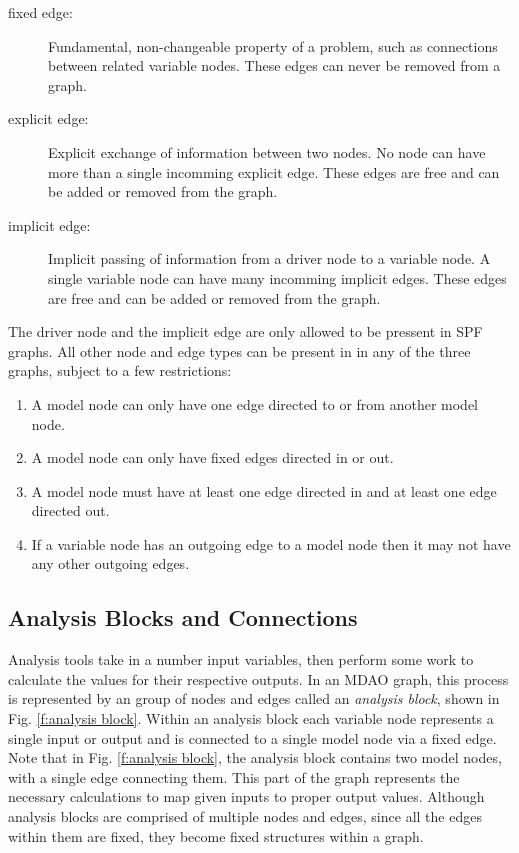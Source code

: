 \begin{description}
\item[fixed edge:] Fundamental, non-changeable property of a problem, such as 
  connections between related variable nodes. These 
edges can never be removed from a graph. 
\item[explicit edge:] Explicit exchange of information between two nodes. No node 
  can have more than a single incomming explicit edge. These edges are free and
  can be added or removed from the graph. 
\item [implicit edge:] Implicit passing of information from a driver node to a 
  variable node. A single variable node can have many incomming implicit edges. These edges are 
  free and can be added or removed from the graph. 
\end{description}

The driver node and the implicit edge are only allowed to be pressent in SPF graphs. All 
other node and edge types can be present in in any of the three graphs, subject to a 
few restrictions: 
\begin{enumerate}
\item A model node can only have one edge directed to or from another model node.
\item A model node can only have fixed edges directed in or out.
\item A model node must have at least one edge directed in and at least one edge 
  directed out.
\item If a variable node has an outgoing edge to a model node then it may not have 
  any other outgoing edges.
\end{enumerate}

\subsection{Analysis Blocks and Connections}

Analysis tools take in a number input variables, then perform some work to calculate 
the values for their respective outputs. In an MDAO graph, this process is 
represented by an group of nodes and edges called an \emph{analysis block}, 
shown in Fig. \ref{f:analysis block}. Within an analysis block each variable 
node represents a single input or output and is connected 
to a single model node via a fixed edge. Note that in Fig. \ref{f:analysis block}, 
the analysis block contains two model nodes, with a single edge connecting them. 
This part of the graph represents the necessary calculations to map given inputs 
to proper output values. Although analysis blocks are comprised of multiple nodes and edges, since all 
the edges within them are fixed, they become fixed structures within a graph.

